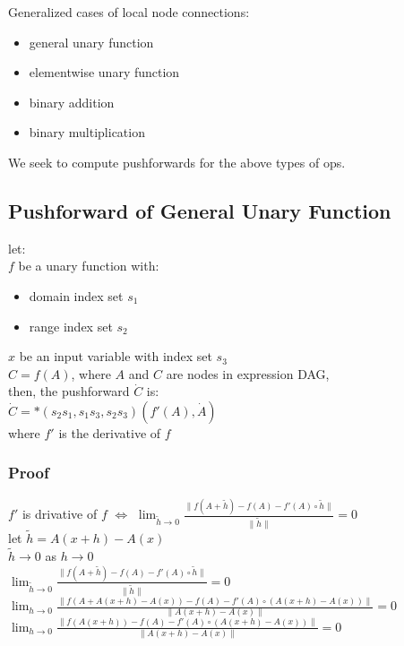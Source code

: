 \documentclass[8pt]{extarticle}
\begin{document}
\begin{multicols*}{2}
  Generalized cases of local node connections:
  \begin{itemize}
  \item general unary function
  \item elementwise unary function
  \item binary addition
  \item binary multiplication
  \end{itemize}

  We seek to compute pushforwards for the above types of ops.

  \vfill\null
  \columnbreak
    
  \subsection{Pushforward of General Unary Function}
  let:\\
  $f$ be a unary function with:
  \begin{itemize}
  \item domain index set $s_1$
  \item range index set $s_2$
  \end{itemize}
  $x$ be an input variable with index set $s_3$\\
  $C=f(A)$, where $A$  and $C$ are nodes in expression DAG,\\
  then, the pushforward $\dot{C}$ is:\\
  $\dot{C} = *(s_2 s_1, s_1 s_3, s_2 s_3)( f'(A), \dot{A})$\\
  where $f'$ is the derivative of $f$

  \subsubsection{Proof}
  $f'$ is drivative of $f$ $\iff$ $\lim_{\tilde{h} \rightarrow 0} \frac{\| f(A+\tilde{h}) - f(A) - f'(A) \circ \tilde{h} \|}{\| \tilde{h} \|} = 0$\\

  let $\tilde{h} = A(x+h) - A(x)$\\
  $\tilde{h} \rightarrow 0$ as $h \rightarrow 0$\\

  $\lim_{\tilde{h} \rightarrow 0} \frac{\| f(A+\tilde{h}) - f(A) - f'(A) \circ \tilde{h} \|}{\| \tilde{h} \|} = 0$\\
  $\lim_{h \rightarrow 0} \frac{\| f(A + A(x+h) - A(x)) - f(A) - f'(A) \circ (A(x+h) - A(x)) \|}{\| A(x+h) - A(x) \|} = 0$\\
  $\lim_{h \rightarrow 0} \frac{\| f(A(x+h)) - f(A) - f'(A) \circ (A(x+h) - A(x)) \|}{\| A(x+h) - A(x) \|} = 0$\\


\end{multicols*}
\end{document}
